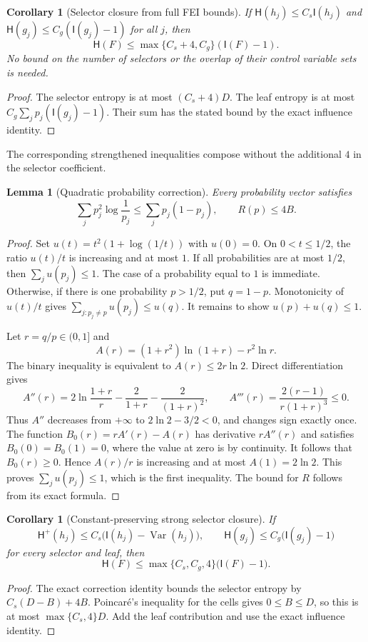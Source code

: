 \documentclass[11pt]{amsart}
\newtheorem{lemma}[theorem]{Lemma}
\newtheorem{corollary}[theorem]{Corollary}
\theoremstyle{definition}
\theoremstyle{remark}
\newcommand{\HH}{\mathsf H}
\newcommand{\I}{\mathsf I}
\begin{document}
\begin{corollary}[Selector closure from full FEI bounds]\label{cor:selector-full}
If $\HH(h_j)\le C_s \I(h_j)$ and
$\HH(g_j)\le C_g(\I(g_j)-1)$ for all $j$, then
\[
 \HH(F)\le\max\{C_s+4,C_g\}(\I(F)-1).
\]
No bound on the number of selectors or the overlap of their control
variable sets is needed.
\end{corollary}
\begin{proof}
The selector entropy is at most $(C_s+4)D$.
The leaf entropy is at most $C_g\sum_jp_j(\I(g_j)-1)$.
Their sum has the stated bound by the exact influence identity.
\end{proof}

The corresponding strengthened inequalities compose without the
additional $4$ in the selector coefficient.

\begin{lemma}[Quadratic probability correction]
Every probability vector satisfies
\[
 \sum_jp_j^2\log\frac1{p_j}\le\sum_jp_j(1-p_j),
 \qquad R(p)\le4B.
\]
\end{lemma}
\begin{proof}
Set $u(t)=t^2(1+\log(1/t))$ with $u(0)=0$.
On $0<t\le1/2$, the ratio $u(t)/t$ is increasing and at most $1$.
If all probabilities are at most $1/2$, then $\sum_j u(p_j)\le1$.
The case of a probability equal to $1$ is immediate. Otherwise, if there is one probability $p>1/2$, put $q=1-p$.
Monotonicity of $u(t)/t$ gives
$\sum_{j:p_j\ne p}u(p_j)\le u(q)$.
It remains to show $u(p)+u(q)\le1$.

Let $r=q/p\in(0,1]$ and
\[
 A(r)=(1+r^2)\ln(1+r)-r^2\ln r.
\]
The binary inequality is equivalent to $A(r)\le2r\ln2$.
Direct differentiation gives
\[
 A''(r)=2\ln\frac{1+r}{r}-\frac2{1+r}-\frac2{(1+r)^2},
 \qquad
 A'''(r)=\frac{2(r-1)}{r(1+r)^3}\le0.
\]
Thus $A''$ decreases from $+\infty$ to $2\ln2-3/2<0$,
and changes sign exactly once. The function
$B_0(r)=rA'(r)-A(r)$ has derivative $rA''(r)$ and satisfies
$B_0(0)=B_0(1)=0$, where the value at zero is by continuity.
It follows that $B_0(r)\ge0$.
Hence $A(r)/r$ is increasing and at most $A(1)=2\ln2$.
This proves $\sum_j u(p_j)\le1$, which is the first inequality.
The bound for $R$ follows from its exact formula.
\end{proof}

\begin{corollary}[Constant-preserving strong selector closure]\label{cor:selector-strong}
If
\[
 \HH^+(h_j)\le C_s\bigl(\I(h_j)-\operatorname{Var}(h_j)\bigr),
 \qquad \HH(g_j)\le C_g\bigl(\I(g_j)-1\bigr)
\]
for every selector and leaf, then
\[
 \HH(F)\le\max\{C_s,C_g,4\}\bigl(\I(F)-1\bigr).
\]
\end{corollary}
\begin{proof}
The exact correction identity bounds the selector entropy by
$C_s(D-B)+4B$. Poincar\'e's inequality for the cells gives $0\le B\le D$,
so this is at most $\max\{C_s,4\}D$.
Add the leaf contribution and use the exact influence identity.
\end{proof}
\end{document}
